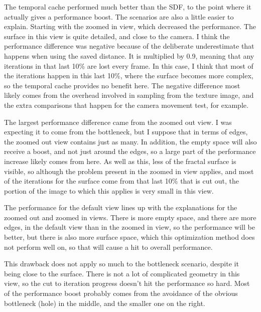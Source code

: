 The temporal cache performed much better than the SDF, to the point where it actually gives a performance boost. The scenarios are also a little easier to explain. Starting with the zoomed in view, which decreased the performance. The surface in this view is quite detailed, and close to the camera. I think the performance difference was negative because of the deliberate underestimate that happens when using the saved distance. It is multiplied by 0.9, meaning that any iterations in that last 10\% are lost every frame. In this case, I think that most of the iterations happen in this last 10\%, where the surface becomes more complex, so the temporal cache provides no benefit here. The negative difference most likely comes from the overhead involved in sampling from the texture image, and the extra comparisons that happen for the camera movement test, for example.\newline

The largest performance difference came from the zoomed out view. I was expecting it to come from the bottleneck, but I suppose that in terms of edges, the zoomed out view contains just as many. In addition, the empty space will also receive a boost, and not just around the edges, so a large part of the performance increase likely comes from here. As well as this, less of the fractal surface is visible, so although the problem present in the zoomed in view applies, and most of the iterations for the surface come from that last 10\% that is cut out, the portion of the image to which this applies is very small in this view.\newline

The performance for the default view lines up with the explanations for the zoomed out and zoomed in views. There is more empty space, and there are more edges, in the default view than in the zoomed in view, so the performance will be better, but there is also more surface space, which this optimization method does not perform well on, so that will cause a hit to overall performance.\newline

This drawback does not apply so much to the bottleneck scenario, despite it being close to the surface. There is not a lot of complicated geometry in this view, so the cut to iteration progress doesn't hit the performance so hard. Most of the performance boost probably comes from the avoidance of the obvious bottleneck (hole) in the middle, and the smaller one on the right.\newline

